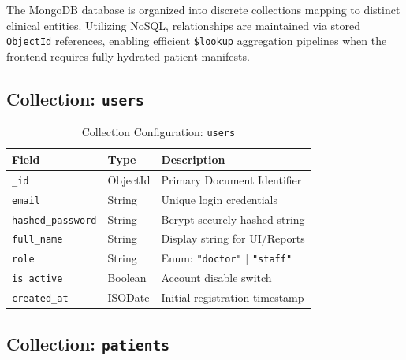 \documentclass[a4paper,12pt]{report}
\begin{document}
The MongoDB database is organized into discrete collections mapping to distinct clinical entities. Utilizing NoSQL, relationships are maintained via stored \texttt{ObjectId} references, enabling efficient \texttt{\$lookup} aggregation pipelines when the frontend requires fully hydrated patient manifests.

\subsection{Collection: \texttt{users}}

\begin{table}[H]
\centering
\caption{Collection Configuration: \texttt{users}}
\vspace{6pt}
\renewcommand{\arraystretch}{1.3}
\begin{tabular}{|l|l|p{7.5cm}|}
\hline
\textbf{Field}          & \textbf{Type}  & \textbf{Description} \\
\hline
\texttt{\_id}           & ObjectId       & Primary Document Identifier \\
\texttt{email}          & String         & Unique login credentials \\
\texttt{hashed\_password} & String       & Bcrypt securely hashed string \\
\texttt{full\_name}     & String         & Display string for UI/Reports \\
\texttt{role}           & String         & Enum: \texttt{"doctor"} $\vert$ \texttt{"staff"} \\
\texttt{is\_active}     & Boolean        & Account disable switch \\
\texttt{created\_at}    & ISODate        & Initial registration timestamp \\
\hline
\end{tabular}
\label{tab:col_users}
\end{table}

\subsection{Collection: \texttt{patients}}
\end{document}

